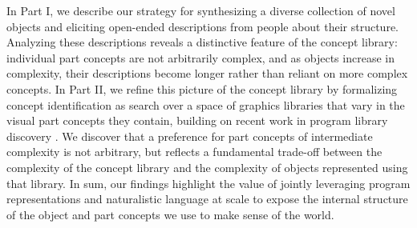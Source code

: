In Part I, we describe our strategy for synthesizing a diverse collection of novel objects and eliciting open-ended descriptions from people about their structure.
Analyzing these descriptions reveals a distinctive feature of the concept library: individual part concepts are not arbitrarily complex, and as objects increase in complexity, their descriptions become longer rather than reliant on more complex concepts.
In Part II, we refine this picture of the concept library by formalizing concept identification as search over a space of graphics libraries that vary in the visual part concepts they contain, building on recent work in program library discovery .
We discover that a preference for part concepts of intermediate complexity is not arbitrary, but reflects a fundamental trade-off between the complexity of the concept library and the complexity of objects represented using that library. 
In sum, our findings highlight the value of jointly leveraging program representations and naturalistic language at scale to expose the internal structure of the object and part concepts we use to make sense of the world. 



